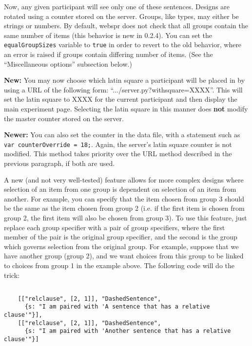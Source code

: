 \documentclass[11pt,letterpaper]{article}
\begin{document}
\smallskip\noindent\normalsize

Now, any given participant will see only one of these
sentences. Designs are rotated using a counter stored on the
server.
Groups, like types, may either be strings or numbers. By
default, webspr does not check that all groups contain the same number
of items (this behavior is new in 0.2.4). You can set the
\texttt{equalGroupSizes} variable to \texttt{true} in order to revert to the old
behavior, where an error is raised if groups contain differing number
of items. (See the ``Miscellaneous options'' subsection below.)

\textbf{New:} You may now choose which latin square a participant will be
placed in by using a URL of the following form:
``.../server.py?withsquare=XXXX''. This will set the latin square to
XXXX for the current participant and then display the main experiment
page.  Selecting the latin square in this manner does \textbf{not} modify the
master counter stored on the server.

\textbf{Newer:} You can also set the counter in the data file, with a
statement such as \texttt{var counterOverride = 18;}. Again, the server's
latin square counter is not modified.  This method takes priority over
the URL method described in the previous paragraph, if both are used.

A new (and not very well-tested) feature allows for more complex designs where
selection of an item from one group is dependent on selection of an item from
another. For example, you can specify that the item chosen from group 3 should
be the same as the item chosen from group 2 (i.e. if the first item is chosen
from group 2, the first item will also be chosen from group 3). To use this
feature, just replace each group specifier with a pair of group specifiers,
where the first member of the pair is the original group specifier, and the
second is the group which governs selection from the original group.  For
example, suppose that we have another group (group 2), and we want choices from
this group to be linked to choices from group 1 in the example above.  The
following code will do the trick:
\footnotesize\begin{verbatim}

    [["relclause", [2, 1]], "DashedSentence",
      {s: "I am paired with 'A sentence that has a relative clause'"}],
    [["relclause", [2, 1]], "DashedSentence",
      {s: "I am paired with 'Another sentence that has a relative clause'"}]
\end{verbatim}
\end{document}
